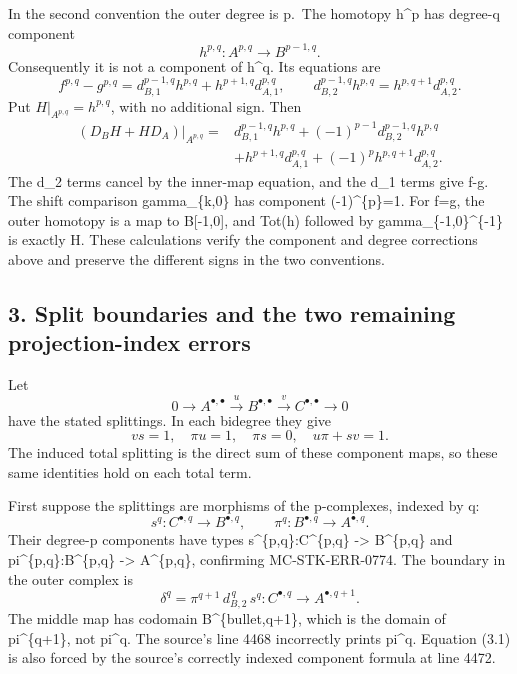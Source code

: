 \documentclass[11pt]{article}
\begin{document}
In the second convention the outer degree is p.~The homotopy h\^{}p has degree-q component \[
h^{p,q}:A^{p,q}\longrightarrow B^{p-1,q}.
\] Consequently it is not a component of h\^{}q. Its equations are \[
f^{p,q}-g^{p,q}
=d_{B,1}^{p-1,q}h^{p,q}+h^{p+1,q}d_{A,1}^{p,q},
\qquad
d_{B,2}^{p-1,q}h^{p,q}=h^{p,q+1}d_{A,2}^{p,q}.
\] Put \(H|_{A^{p,q}}=h^{p,q}\), with no additional sign. Then \[
\begin{aligned}
(D_BH+HD_A)|_{A^{p,q}}
={}&d_{B,1}^{p-1,q}h^{p,q}
 +(-1)^{p-1}d_{B,2}^{p-1,q}h^{p,q}\\
 &+h^{p+1,q}d_{A,1}^{p,q}
 +(-1)^p h^{p,q+1}d_{A,2}^{p,q}.
\end{aligned}
\] The d\_2 terms cancel by the inner-map equation, and the d\_1 terms give f-g. The shift comparison gamma\_\{k,0\} has component (-1)\^{}\{p\}=1. For f=g, the outer homotopy is a map to B{[}-1,0{]}, and Tot(h) followed by gamma\_\{-1,0\}\^{}\{-1\} is exactly H. These calculations verify the component and degree corrections above and preserve the different signs in the two conventions.

\subsection{3. Split boundaries and the two remaining projection-index errors}\label{note-04-split-boundaries-and-the-two-remaining-projection-index-errors}

Let \[
0\longrightarrow A^{\bullet,\bullet}
\xrightarrow{u}B^{\bullet,\bullet}
\xrightarrow{v}C^{\bullet,\bullet}\longrightarrow0
\] have the stated splittings. In each bidegree they give \[
v s=1,\quad \pi u=1,\quad \pi s=0,\quad u\pi+s v=1.
\] The induced total splitting is the direct sum of these component maps, so these same identities hold on each total term.

First suppose the splittings are morphisms of the p-complexes, indexed by q: \[
s^q:C^{\bullet,q}\longrightarrow B^{\bullet,q},\qquad
\pi^q:B^{\bullet,q}\longrightarrow A^{\bullet,q}.
\] Their degree-p components have types s\^{}\{p,q\}:C\^{}\{p,q\} -\textgreater{} B\^{}\{p,q\} and pi\^{}\{p,q\}:B\^{}\{p,q\} -\textgreater{} A\^{}\{p,q\}, confirming MC-STK-ERR-0774. The boundary in the outer complex is \[
\boxed{\quad
\delta^q=\pi^{q+1}\,d_{B,2}^{\,q}\,s^q:
C^{\bullet,q}\longrightarrow A^{\bullet,q+1}.
\quad}                                                     \tag{3.1}
\] The middle map has codomain B\^{}\{bullet,q+1\}, which is the domain of pi\^{}\{q+1\}, not pi\^{}q. The source's line 4468 incorrectly prints pi\^{}q. Equation (3.1) is also forced by the source's correctly indexed component formula at line 4472.
\end{document}
